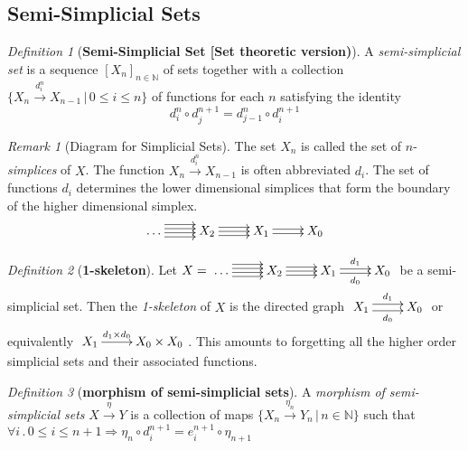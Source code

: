 \documentclass[10pt]{article}
\newcommand{\onearrow}[3]{\mbox{$#1 \stackrel{#2}{\longrightarrow} #3$}}
\theoremstyle{remark}
\newtheorem{definition}{Definition}
\newtheorem{remark}{Remark}
\begin{document}
\subsection{Semi-Simplicial Sets}

\begin{definition}[\textbf{Semi-Simplicial Set [Set theoretic version)}]
A \emph{semi-simplicial set} is a sequence $[X_n]_{n \in \mathbb{N}}$ of sets together with a collection $\{ \onearrow{X_n}{d_i^n}{X_{n-1}} \, | \, 0 \leq i \leq n \}$ of functions for each $n$ satisfying the identity
$$
d_i^n \circ d_j^{n+1} = d_{j-1}^n \circ d_i^{n+1}
$$
\end{definition}

\begin{remark}[Diagram for Simplicial Sets]
The set $X_n$ is called the set of $n$-\emph{simplices} of $X$. The function \onearrow{X_n}{d_i^n}{X_{n-1}} is often abbreviated $d_i$. The set of functions $d_i$ determines the lower dimensional simplices that form the boundary of the higher dimensional simplex.
$$ \xymatrix{
\ldots \ar@<1.25ex>[r]  \ar@<0.5ex>[r]  \ar@<-0.25ex>[r]  \ar@<-1.0ex>[r] &
     X_2 \ar@<0.75ex>[r]  \ar[r] \ar@<-0.75ex>[r] &
     X_1 \ar@<0.4ex>[r] \ar@<-0.4ex>[r] &
     X_0
} $$
\end{remark}

\begin{definition}[\textbf{1-skeleton}]
Let $X = 
\xymatrix{
\ldots \ar@<1.25ex>[r]  \ar@<0.5ex>[r]  \ar@<-0.25ex>[r]  \ar@<-1.0ex>[r] &
     X_2 \ar@<0.75ex>[r]  \ar[r] \ar@<-0.75ex>[r] &
     X_1 \ar@<0.4ex>[r]^{d_1} \ar@<-0.4ex>[r]_{d_0} &
     X_0
}
$ be a semi-simplicial set. Then the \emph{1-skeleton} of $X$ is the directed graph
$\xymatrix{
     X_1 \ar@<0.6ex>[r]^-{d_1} \ar@<-0.6ex>[r]_-{d_0} & X_0
}$
or equivalently
$\xymatrix{
     X_1 \ar[r]^-{d_1 \times d_0} & X_0 \times X_0
}$. This amounts to forgetting all the higher order simplicial sets and their associated functions.
\end{definition}

\begin{definition}[\textbf{morphism of semi-simplicial sets}]
A \emph{morphism of semi-simplicial sets} \onearrow{X}{\eta}{Y} is a collection of maps $\{ \onearrow{X_n}{\eta_n}{Y_n} \, | \,n \in \mathbb{N} \}$ such that $\forall i \, . \, 0 \leq i \leq n+1 \Longrightarrow \eta_n \circ d_i^{n+1} = e_i^{n+1} \circ \eta_{n+1}$

\end{definition}
\end{document}
